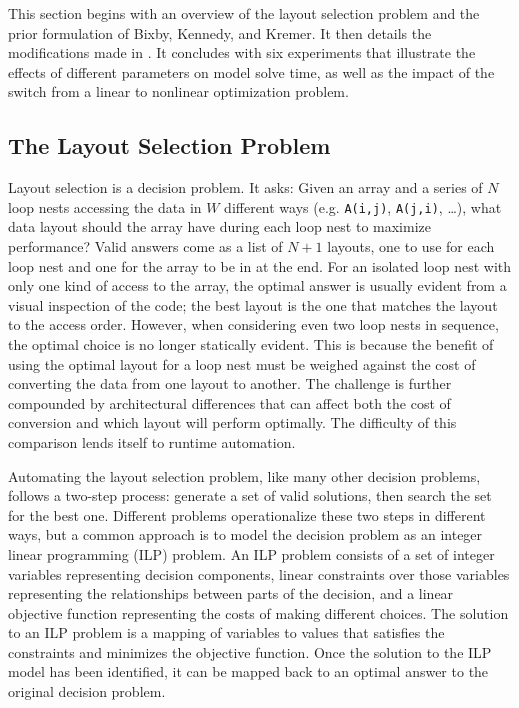 This section begins with an overview of the layout selection problem and the prior formulation of Bixby, Kennedy, and Kremer.
It then details the modifications made in \FormatDecisions{}.
It concludes with six experiments that illustrate the effects of different parameters on model solve time, as well as the impact of the switch from a linear to nonlinear optimization problem.

\subsection{The Layout Selection Problem}

Layout selection is a decision problem.
It asks: Given an array and a series of $N$ loop nests accessing the data in $W$ different ways (e.g. \verb.A(i,j)., \verb.A(j,i)., \dots), what data layout should the array have during each loop nest to maximize performance?
Valid answers come as a list of $N+1$ layouts, one to use for each loop nest and one for the array to be in at the end.
For an isolated loop nest with only one kind of access to the array, the optimal answer is usually evident from a visual inspection of the code; the best layout is the one that matches the layout to the access order.
However, when considering even two loop nests in sequence, the optimal choice is no longer statically evident.
This is because the benefit of using the optimal layout for a loop nest must be weighed against the cost of converting the data from one layout to another.
The challenge is further compounded by architectural differences that can affect both the cost of conversion and which layout will perform optimally.
The difficulty of this comparison lends itself to runtime automation.

Automating the layout selection problem, like many other decision problems, follows a two-step process: generate a set of valid solutions, then search the set for the best one.
Different problems operationalize these two steps in different ways, but a common approach is to model the decision problem as an integer linear programming (ILP) problem.
An ILP problem consists of a set of integer variables representing decision components, linear constraints over those variables representing the relationships between parts of the decision, and a linear objective function representing the costs of making different choices.
The solution to an ILP problem is a mapping of variables to values that satisfies the constraints and minimizes the objective function.
Once the solution to the ILP model has been identified, it can be mapped back to an optimal answer to the original decision problem.

